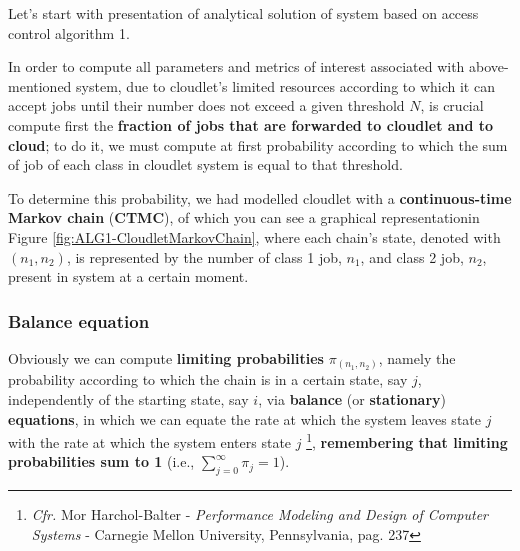 \documentclass[10pt,a4paper]{article}
\begin{document}
Let's start with presentation of analytical solution of system based on access control algorithm 1.

In order to compute all parameters and metrics of interest associated with above-mentioned system, due to cloudlet's limited resources according to which it can accept jobs until their number does not exceed a given threshold $N$, is crucial compute first the \textbf{fraction of jobs that are forwarded to cloudlet and to cloud}; to do it, we must compute at first probability according to which the sum of job of each class in cloudlet system is equal to that threshold. 

To determine this probability, we had modelled cloudlet with a \textbf{continuous-time Markov chain} (\textbf{CTMC}), of which you can see a graphical representationin Figure \ref{fig:ALG1-CloudletMarkovChain}, where each chain's state, denoted with $(n_1,n_2)$, is represented by the number of class 1 job, $n_1$, and class 2 job, $n_2$, present in system at a certain moment.



\subsubsection{Balance equation} 

Obviously we can compute \textbf{limiting probabilities} $\pi_{(n_1,n_2)}$, namely the probability according to which the chain is in a certain state, say $j$, independently of the starting state, say $i$, via \textbf{balance} (or \textbf{stationary}) \textbf{equations}, in which we can equate the rate at which the system leaves state $j$ with the rate at which the system enters state $j$ \footnote{\textit{Cfr.} Mor Harchol-Balter - \textit{Performance Modeling and Design of Computer Systems} - Carnegie Mellon University, Pennsylvania, pag. 237}, \textbf{remembering that limiting probabilities sum to 1} (i.e., $\sum_{j=0}^\infty \pi_j = 1$).
\end{document}
